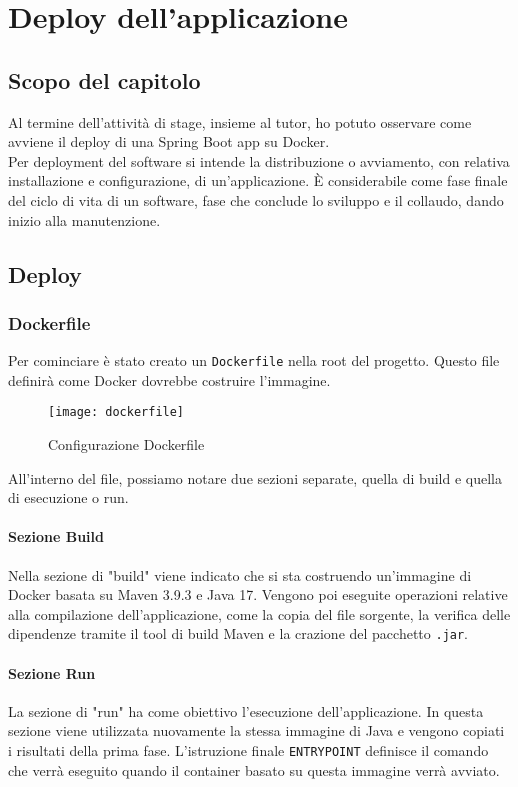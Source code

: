 \chapter{Deploy dell'applicazione}
\label{cap:deploy}
\section{Scopo del capitolo}
Al termine dell'attività di stage, insieme al tutor, ho potuto osservare come avviene il deploy di una Spring Boot app su Docker.\\
Per deployment del software si intende la distribuzione o avviamento, con relativa installazione e configurazione, di un'applicazione. È considerabile come fase finale del ciclo di vita di un software, fase che conclude lo sviluppo e il collaudo, dando inizio alla manutenzione.
\section{Deploy}
\subsection{Dockerfile}
Per cominciare è stato creato un \texttt{Dockerfile} nella root del progetto. Questo file definirà come Docker dovrebbe costruire l'immagine.
\begin{figure}[H] 
    \centering 
    \texttt{[image: dockerfile]} 
    \caption{Configurazione Dockerfile}
\end{figure}
\noindent All'interno del file, possiamo notare due sezioni separate, quella di build e quella di esecuzione o run.
\subsubsection*{Sezione Build}
Nella sezione di "build" viene indicato che si sta costruendo un'immagine di Docker basata su Maven 3.9.3 e Java 17. Vengono poi eseguite operazioni relative alla compilazione dell'applicazione, come la copia del file sorgente, la verifica delle dipendenze tramite il tool di build Maven e la crazione del pacchetto \texttt{.jar}.
\subsubsection*{Sezione Run}
La sezione di "run" ha come obiettivo l'esecuzione dell'applicazione. In questa sezione viene utilizzata nuovamente la stessa immagine di Java e vengono copiati i risultati della prima fase. L'istruzione finale \texttt{ENTRYPOINT} definisce il comando che verrà eseguito quando il container basato su questa immagine verrà avviato.
